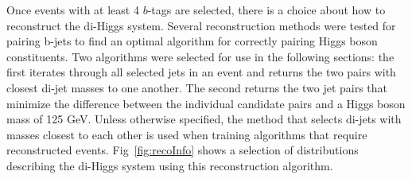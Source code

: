 Once events with at least 4 $b$-tags are selected, there is a choice about how to reconstruct the di-Higgs system. Several reconstruction methods were tested for pairing b-jets to find an optimal algorithm for correctly pairing Higgs boson constituents. Two algorithms were selected for use in the following sections: the first iterates through all selected jets in an event and returns the two pairs with closest di-jet masses to one another. The second returns the two jet pairs that minimize the difference between the individual candidate pairs and a Higgs boson mass of 125 GeV. Unless otherwise specified, the method that selects di-jets with masses closest to each other is used when training algorithms that require reconstructed events. Fig~\ref{fig:recoInfo} shows a selection of distributions describing the di-Higgs system using this reconstruction algorithm.

